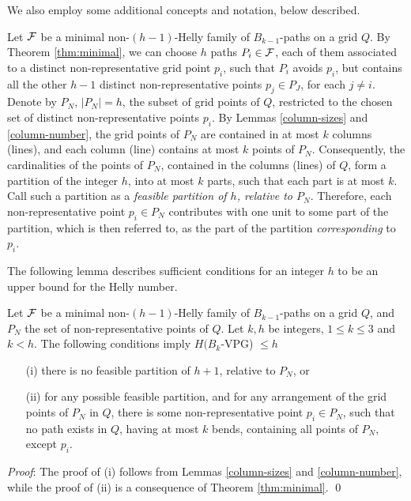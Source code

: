 We also employ some additional concepts and notation, below described.

Let $\cal F$ be a minimal non-$(h-1)$-Helly family of $B_{k-1}$-paths on a grid $Q$. By Theorem \ref{thm:minimal},  we can choose $h$ paths $P_i \in {\cal F}$, each of them associated to a distinct non-representative grid point $p_i$, such that $P_i$ avoids $p_i$, but contains all the other $h-1$ distinct non-representative points $p_j \in P_J$, for each   $j \neq i$. Denote by $P_N$, $|P_N|=h$, the subset of grid  points of  $Q$, restricted to the chosen set of distinct  non-representative points $p_i$. By Lemmas \ref{column-sizes} and \ref{column-number}, the grid points of $P_N$ are contained in at most $k$ columns (lines), and each column (line) contains at most $k$ points of $P_N$. Consequently, the cardinalities of the points of $P_N$, contained in the columns (lines) of $Q$,  form a partition of the integer $h$, into at most $k$ parts, such that each part is at most $k$. Call such a partition as a {\it feasible  partition  of $h$, relative to $P_N$}. Therefore, each non-representative point $p_i \in P_N$ contributes with one unit to some part of the partition, which is then referred to,   as the part of the partition {\it corresponding} to $p_i$.    

The following lemma describes sufficient conditions for an integer $h$ to be an upper bound for the Helly number.

\begin{lemma}\label{upper-bound} Let $\cal F$ be a minimal non-$(h-1)$-Helly family of $B_{k-1}$-paths on a grid $Q$, and $P_N$ the set of non-representative points of $Q$. Let $k,h$ be integers, $1 \leq k \leq 3$ and $k < h$. The following conditions imply $H(B_k$-VPG) $\leq h$  
\begin{itemize}
    \item[(i)] there is no feasible partition of $h+1$, relative to $P_N$, or 
    \item[(ii)] for any possible feasible partition, and for any arrangement of the grid points of $P_N$ in $Q$, there is some non-representative point $p_i \in P_N$, such that  no path exists  in $Q$, having at most $k$ bends, containing all points of $P_N$, except $p_i$.    
\end{itemize}
\end{lemma}
{\it Proof}: The proof of (i) follows from Lemmas \ref{column-sizes} and \ref{column-number}, while the proof of (ii) is a consequence of Theorem \ref{thm:minimal}.  \qed \\

